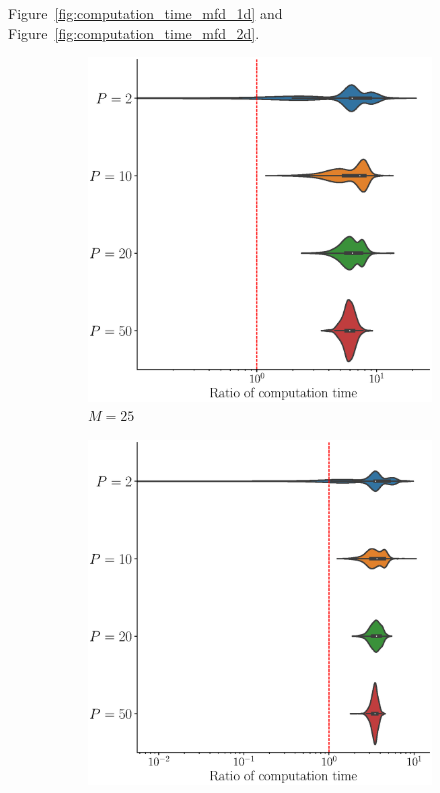 \begin{results}

Figure~\ref{fig:computation_time_mfd_1d} and Figure~\ref{fig:computation_time_mfd_2d}.

\begin{figure}
     \centering
     \begin{subfigure}[b]{0.49\textwidth}
         \centering
         \includegraphics[width=\textwidth]{figures/scenario_1/computation_time_N50_M25.eps}
         \caption{$M = 25$}
         \label{fig:computation_time_mfd_1d_25}
     \end{subfigure}
     \hfill
     \begin{subfigure}[b]{0.49\textwidth}
         \centering
         \includegraphics[width=\textwidth]{figures/scenario_1/computation_time_N50_M50.eps}

\end{subfigure}
\end{figure}
\end{results}
